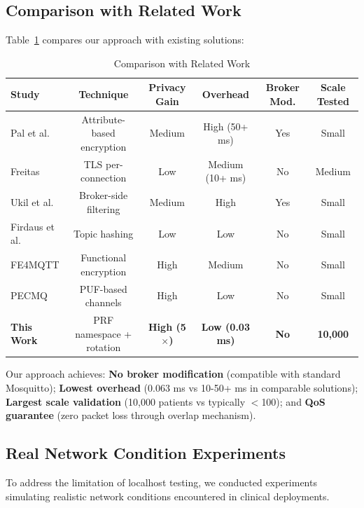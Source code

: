 \documentclass[conference]{IEEEtran}
\begin{document}
\subsection{Comparison with Related Work}

Table~\ref{tab:comparison} compares our approach with existing solutions:

\begin{table}[htbp]
\caption{Comparison with Related Work}
\label{tab:comparison}
\centering
\begin{tabular}{lccccc}
\toprule
\textbf{Study} & \textbf{Technique} & \textbf{Privacy Gain} & \textbf{Overhead} & \textbf{Broker Mod.} & \textbf{Scale Tested} \\
\midrule
Pal et al. \cite{pal_abe} & Attribute-based encryption & Medium & High (50+ ms) & Yes & Small \\
Freitas \cite{freitas_tls} & TLS per-connection & Low & Medium (10+ ms) & No & Medium \\
Ukil et al. \cite{ukil_broker} & Broker-side filtering & Medium & High & Yes & Small \\
Firdaus et al. \cite{firdaus_hash} & Topic hashing & Low & Low & No & Small \\
FE4MQTT \cite{fe4mqtt} & Functional encryption & High & Medium & No & Small \\
PECMQ \cite{pecmq} & PUF-based channels & High & Low & No & Small \\
\textbf{This Work} & PRF namespace + rotation & \textbf{High (5$\times$)} & \textbf{Low (0.03 ms)} & \textbf{No} & \textbf{10,000} \\
\bottomrule
\end{tabular}
\end{table}

Our approach achieves: \textbf{No broker modification} (compatible with standard Mosquitto); \textbf{Lowest overhead} (0.063 ms vs 10-50+ ms in comparable solutions); \textbf{Largest scale validation} (10,000 patients vs typically $<$100); and \textbf{QoS guarantee} (zero packet loss through overlap mechanism).

\subsection{Real Network Condition Experiments}

To address the limitation of localhost testing, we conducted experiments simulating realistic network conditions encountered in clinical deployments.
\end{document}
